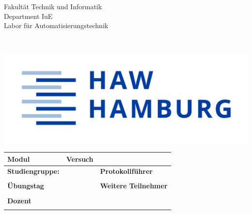 \documentclass[10pt,a4paper]{article}
\begin{document}
\begin{titlepage}
		
	{\scriptsize
				
		\begin{multicols}{3}
			\noindent	
			Fakultät Technik und Informatik \\
			Department IuE \\
			Labor für Automatisierungstechnik \\	
			\prof
								
			\columnbreak
			~
						
			\columnbreak
			\noindent		
			\includegraphics[scale=0.3]{bilder/HAW_Marke_RGB_300dpi.jpg} \\
						
		\end{multicols}
	}
		
	\begin{table}[htp]
		\begin{tabular}{|p{4cm}|p{6cm}|p{4cm}|}
			\hline
			\textbf{Modul} \modul    	& \centering \textbf{Versuch} \versuchnummer	 & \textbf{\semester}          	 	\\ \hline
			\textbf{Studiengruppe: }	& \centering {\large \textbf{Beurteilung}}   			 & \textbf{Protokollführer}        	\\
			\studiengruppe           		& \multirow{5}{*}{}                          						 & \protokollfuehrer          		   	\\  \cline{1-1} \cline{3-3} 
			\textbf{Übungstag }     		&                                            								 & \textbf{Weitere Teilnehmer} 	\\
			\uebungstag              			&                                            								 &                             					\\ \cline{1-1}	
			\textbf{Dozent}          		&                                            								 & \weitereTeilnehmerA         		\\
			\prof                    				&                                                                               & \weitereTeilnehmerB         		\\ \hline
		\end{tabular}
	\end{table}
		

\end{titlepage}
\end{document}
